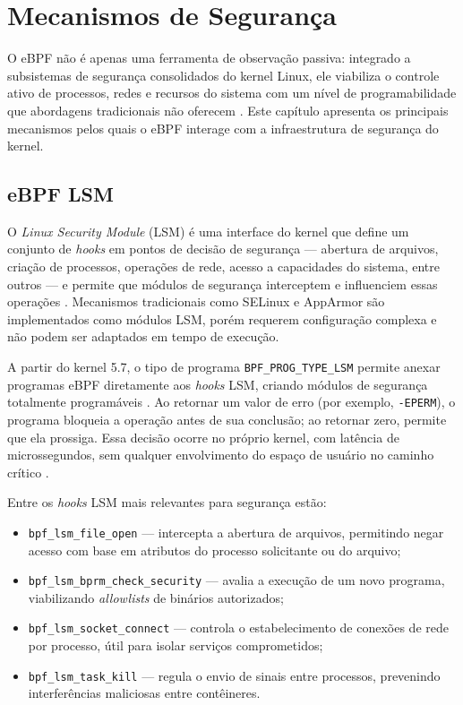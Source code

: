 \chapter{Mecanismos de Segurança}
\label{cap:mecanismos}

O eBPF não é apenas uma ferramenta de observação passiva: integrado a subsistemas
de segurança consolidados do kernel Linux, ele viabiliza o controle ativo de
processos, redes e recursos do sistema com um nível de programabilidade que
abordagens tradicionais não oferecem \cite{linuxkernel2024}.
Este capítulo apresenta os principais mecanismos pelos quais o eBPF interage com
a infraestrutura de segurança do kernel.

\section{eBPF LSM}

O \textit{Linux Security Module} (LSM) é uma interface do kernel que define um
conjunto de \textit{hooks} em pontos de decisão de segurança — abertura de
arquivos, criação de processos, operações de rede, acesso a capacidades do sistema,
entre outros — e permite que módulos de segurança interceptem e influenciem essas
operações \cite{linuxkernel2024}.
Mecanismos tradicionais como SELinux e AppArmor são implementados como módulos
LSM, porém requerem configuração complexa e não podem ser adaptados em tempo de
execução.

A partir do kernel 5.7, o tipo de programa \texttt{BPF\_PROG\_TYPE\_LSM} permite
anexar programas eBPF diretamente aos \textit{hooks} LSM, criando módulos de
segurança totalmente programáveis \cite{linuxkernel2024}.
Ao retornar um valor de erro (por exemplo, \texttt{-EPERM}), o programa bloqueia
a operação antes de sua conclusão; ao retornar zero, permite que ela prossiga.
Essa decisão ocorre no próprio kernel, com latência de microssegundos, sem
qualquer envolvimento do espaço de usuário no caminho crítico
\cite{gregg2019}.

Entre os \textit{hooks} LSM mais relevantes para segurança estão:

\begin{itemize}
  \item \texttt{bpf\_lsm\_file\_open} — intercepta a abertura de arquivos,
        permitindo negar acesso com base em atributos do processo solicitante ou
        do arquivo;
  \item \texttt{bpf\_lsm\_bprm\_check\_security} — avalia a execução de um novo
        programa, viabilizando \textit{allowlists} de binários autorizados;
  \item \texttt{bpf\_lsm\_socket\_connect} — controla o estabelecimento de
        conexões de rede por processo, útil para isolar serviços comprometidos;
  \item \texttt{bpf\_lsm\_task\_kill} — regula o envio de sinais entre processos,
        prevenindo interferências maliciosas entre contêineres.
\end{itemize}

